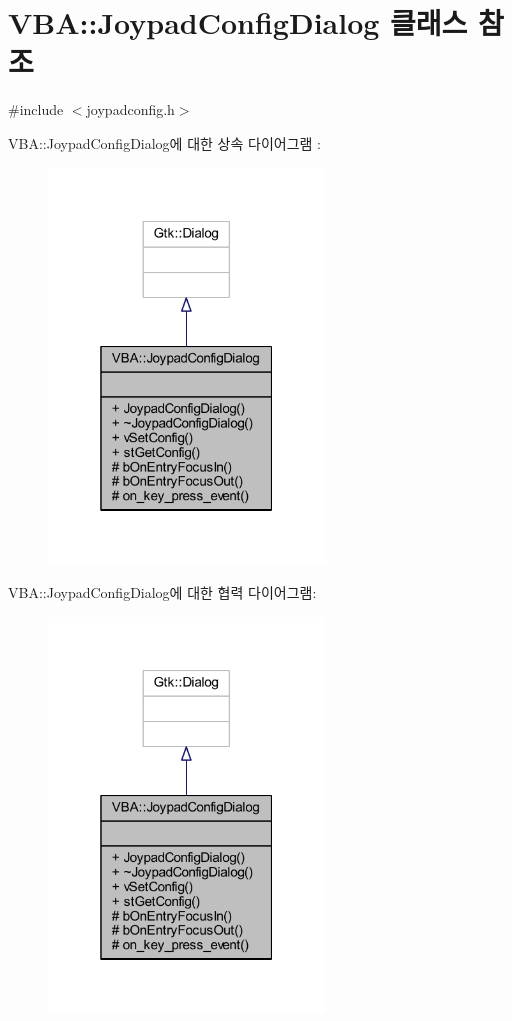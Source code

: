 \hypertarget{class_v_b_a_1_1_joypad_config_dialog}{}\section{V\+BA\+:\+:Joypad\+Config\+Dialog 클래스 참조}
\label{class_v_b_a_1_1_joypad_config_dialog}


{\ttfamily \#include $<$joypadconfig.\+h$>$}



V\+BA\+:\+:Joypad\+Config\+Dialog에 대한 상속 다이어그램 \+: \nopagebreak
\begin{figure}[H]
\begin{center}
\leavevmode
\includegraphics[width=208pt]{class_v_b_a_1_1_joypad_config_dialog__inherit__graph}
\end{center}
\end{figure}


V\+BA\+:\+:Joypad\+Config\+Dialog에 대한 협력 다이어그램\+:\nopagebreak
\begin{figure}[H]
\begin{center}
\leavevmode
\includegraphics[width=208pt]{class_v_b_a_1_1_joypad_config_dialog__coll__graph}
\end{center}
\end{figure}
